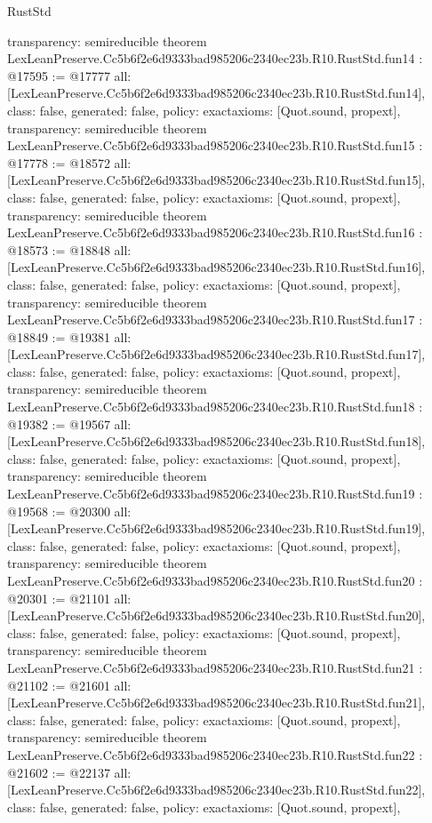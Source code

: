 \begin{lexlean}{RustStd}
\begin{coremodule}
{  transparency: semireducible
}
theorem LexLeanPreserve.Cc5b6f2e6d9333bad985206c2340ec23b.R10.RustStd.fun14 : @17595 := @17777 {
  all: [LexLeanPreserve.Cc5b6f2e6d9333bad985206c2340ec23b.R10.RustStd.fun14],
  class: false,
  generated: false,
  policy: exact{axioms: [Quot.sound, propext]},
  transparency: semireducible
}
theorem LexLeanPreserve.Cc5b6f2e6d9333bad985206c2340ec23b.R10.RustStd.fun15 : @17778 := @18572 {
  all: [LexLeanPreserve.Cc5b6f2e6d9333bad985206c2340ec23b.R10.RustStd.fun15],
  class: false,
  generated: false,
  policy: exact{axioms: [Quot.sound, propext]},
  transparency: semireducible
}
theorem LexLeanPreserve.Cc5b6f2e6d9333bad985206c2340ec23b.R10.RustStd.fun16 : @18573 := @18848 {
  all: [LexLeanPreserve.Cc5b6f2e6d9333bad985206c2340ec23b.R10.RustStd.fun16],
  class: false,
  generated: false,
  policy: exact{axioms: [Quot.sound, propext]},
  transparency: semireducible
}
theorem LexLeanPreserve.Cc5b6f2e6d9333bad985206c2340ec23b.R10.RustStd.fun17 : @18849 := @19381 {
  all: [LexLeanPreserve.Cc5b6f2e6d9333bad985206c2340ec23b.R10.RustStd.fun17],
  class: false,
  generated: false,
  policy: exact{axioms: [Quot.sound, propext]},
  transparency: semireducible
}
theorem LexLeanPreserve.Cc5b6f2e6d9333bad985206c2340ec23b.R10.RustStd.fun18 : @19382 := @19567 {
  all: [LexLeanPreserve.Cc5b6f2e6d9333bad985206c2340ec23b.R10.RustStd.fun18],
  class: false,
  generated: false,
  policy: exact{axioms: [Quot.sound, propext]},
  transparency: semireducible
}
theorem LexLeanPreserve.Cc5b6f2e6d9333bad985206c2340ec23b.R10.RustStd.fun19 : @19568 := @20300 {
  all: [LexLeanPreserve.Cc5b6f2e6d9333bad985206c2340ec23b.R10.RustStd.fun19],
  class: false,
  generated: false,
  policy: exact{axioms: [Quot.sound, propext]},
  transparency: semireducible
}
theorem LexLeanPreserve.Cc5b6f2e6d9333bad985206c2340ec23b.R10.RustStd.fun20 : @20301 := @21101 {
  all: [LexLeanPreserve.Cc5b6f2e6d9333bad985206c2340ec23b.R10.RustStd.fun20],
  class: false,
  generated: false,
  policy: exact{axioms: [Quot.sound, propext]},
  transparency: semireducible
}
theorem LexLeanPreserve.Cc5b6f2e6d9333bad985206c2340ec23b.R10.RustStd.fun21 : @21102 := @21601 {
  all: [LexLeanPreserve.Cc5b6f2e6d9333bad985206c2340ec23b.R10.RustStd.fun21],
  class: false,
  generated: false,
  policy: exact{axioms: [Quot.sound, propext]},
  transparency: semireducible
}
theorem LexLeanPreserve.Cc5b6f2e6d9333bad985206c2340ec23b.R10.RustStd.fun22 : @21602 := @22137 {
  all: [LexLeanPreserve.Cc5b6f2e6d9333bad985206c2340ec23b.R10.RustStd.fun22],
  class: false,
  generated: false,
  policy: exact{axioms: [Quot.sound, propext]},
}
\end{coremodule}
\end{lexlean}
